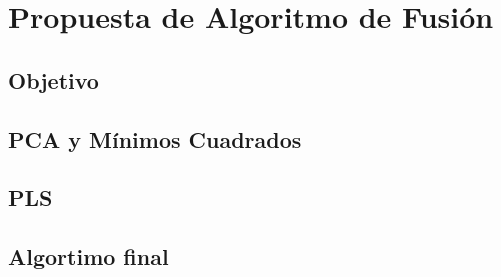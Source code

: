 \chapter{Propuesta de Algoritmo de Fusión}

\section{Objetivo}

\section{PCA y Mínimos Cuadrados}

\section{PLS}

\section{Algortimo final}